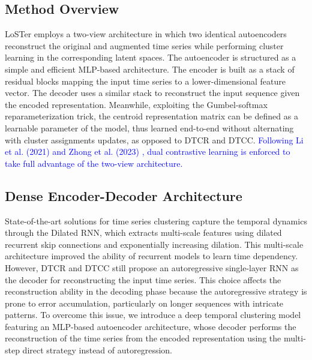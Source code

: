 \documentclass[times, review, 10pt]{elsarticle}
\begin{document}
\subsection{Method Overview}
LoSTer employs a two-view architecture in which two identical autoencoders reconstruct the original and augmented time series while performing cluster learning in the corresponding latent spaces. The autoencoder is structured as a simple and efficient MLP-based architecture. The encoder is built as a stack of residual blocks mapping the input time series to a lower-dimensional feature vector. The decoder uses a similar stack to reconstruct the input sequence given the encoded representation. Meanwhile, exploiting the Gumbel-softmax reparameterization trick, the centroid representation matrix can be defined as a learnable parameter of the model, thus learned end-to-end without alternating with cluster assignments updates, as opposed to DTCR and DTCC. \textcolor{blue}{Following Li et al. (2021) \cite{li2021contrastive} and Zhong et al. (2023) \cite{zhong2023deep}, dual contrastive learning is enforced to take full advantage of the two-view architecture.}

\subsection{Dense Encoder-Decoder Architecture}
State-of-the-art solutions for time series clustering capture the temporal dynamics through the Dilated RNN, which extracts multi-scale features using dilated recurrent skip connections and exponentially increasing dilation. This multi-scale architecture improved the ability of recurrent models to learn time dependency. However, DTCR and DTCC still propose an autoregressive single-layer RNN as the decoder for reconstructing the input time series. This choice affects the reconstruction ability in the decoding phase because the autoregressive strategy is prone to error accumulation, particularly on longer sequences with intricate patterns.
To overcome this issue, we introduce a deep temporal clustering model featuring an MLP-based autoencoder architecture, whose decoder performs the reconstruction of the time series from the encoded representation using the multi-step direct strategy instead of autoregression.
\end{document}
